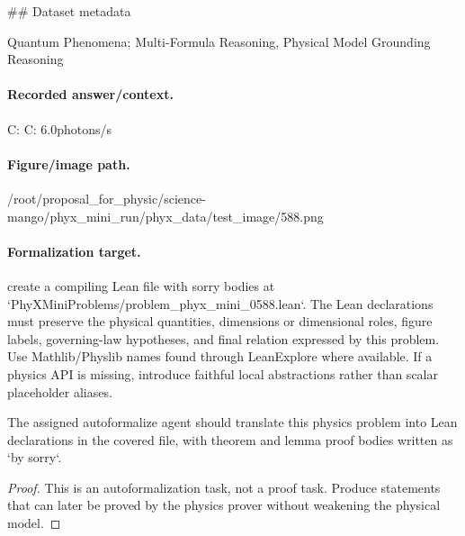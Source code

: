 \#\# Dataset metadata

Quantum Phenomena; Multi-Formula Reasoning, Physical Model Grounding Reasoning

\paragraph{Recorded answer/context.}
C: C: 6.0photons/s

\paragraph{Figure/image path.}
/root/proposal\_for\_physic/science-mango/phyx\_mini\_run/phyx\_data/test\_image/588.png

\paragraph{Formalization target.}
create a compiling Lean file with sorry bodies at `PhyXMiniProblems/problem\_phyx\_mini\_0588.lean`. The Lean declarations must preserve the physical quantities, dimensions or dimensional roles, figure labels, governing-law hypotheses, and final relation expressed by this problem.
Use Mathlib/Physlib names found through LeanExplore where available. If a physics API is missing, introduce faithful local abstractions rather than scalar placeholder aliases.

\begin{theorem}
\label{thm:physics:phyx_mini_0588:target}
The assigned autoformalize agent should translate this physics problem into Lean declarations in the covered file, with theorem and lemma proof bodies written as `by sorry`.
\end{theorem}
\begin{proof}
This is an autoformalization task, not a proof task. Produce statements that can later be proved by the physics prover without weakening the physical model.
\end{proof}

